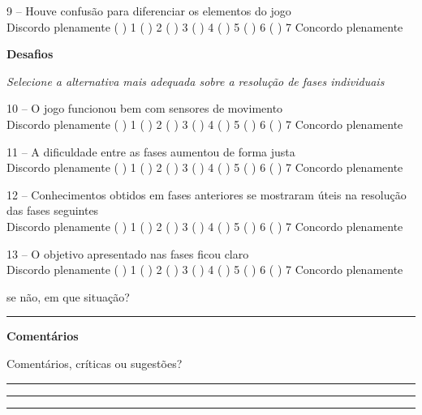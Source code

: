 9 – Houve confusão para diferenciar os elementos do jogo \\
Discordo plenamente ( ) 1 ( ) 2 ( ) 3 ( ) 4 ( ) 5 ( ) 6 ( ) 7 Concordo plenamente

\textbf{Desafios}

\textit{Selecione a alternativa mais adequada sobre a resolução de fases individuais}


10 – O jogo funcionou bem com sensores de movimento \\
Discordo plenamente ( ) 1 ( ) 2 ( ) 3 ( ) 4 ( ) 5 ( ) 6 ( ) 7 Concordo plenamente

11 – A dificuldade entre as fases aumentou de forma justa \\
Discordo plenamente ( ) 1 ( ) 2 ( ) 3 ( ) 4 ( ) 5 ( ) 6 ( ) 7 Concordo plenamente

12 – Conhecimentos obtidos em fases anteriores se mostraram úteis na resolução das fases seguintes \\
Discordo plenamente ( ) 1 ( ) 2 ( ) 3 ( ) 4 ( ) 5 ( ) 6 ( ) 7 Concordo plenamente

13 – O objetivo apresentado nas fases ficou claro \\
Discordo plenamente ( ) 1 ( ) 2 ( ) 3 ( ) 4 ( ) 5 ( ) 6 ( ) 7 Concordo plenamente

se não, em que situação? 

\rule{\linewidth-\marginparwidth}{0.4pt}

\textbf{Comentários}

Comentários, críticas ou sugestões?

\rule{\linewidth-\marginparwidth}{0.4pt}

\rule{\linewidth-\marginparwidth}{0.4pt}

\rule{\linewidth-\marginparwidth}{0.4pt}